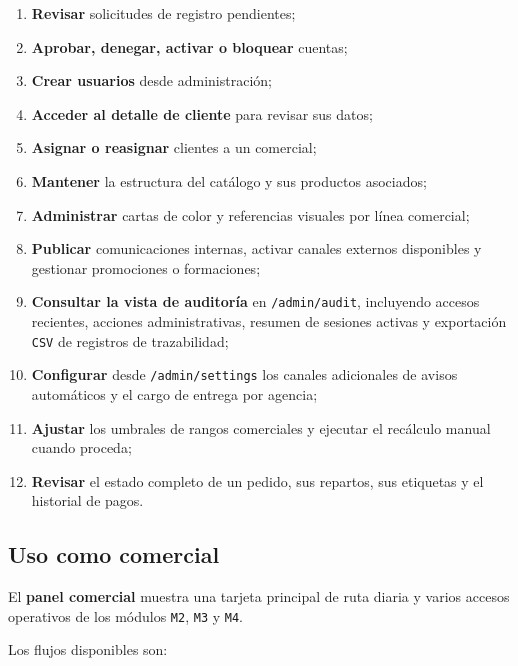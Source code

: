 \begin{enumerate}
    \item \textbf{Revisar} solicitudes de registro pendientes;
    \item \textbf{Aprobar, denegar, activar o bloquear} cuentas;
    \item \textbf{Crear usuarios} desde administración;
    \item \textbf{Acceder al detalle de cliente} para revisar sus datos;
    \item \textbf{Asignar o reasignar} clientes a un comercial;
    \item \textbf{Mantener} la estructura del catálogo y sus productos asociados;
    \item \textbf{Administrar} cartas de color y referencias visuales por línea comercial;
    \item \textbf{Publicar} comunicaciones internas, activar canales externos disponibles y gestionar promociones o formaciones;
    \item \textbf{Consultar la vista de auditoría} en \texttt{/admin/audit}, incluyendo accesos recientes, acciones administrativas, resumen de sesiones activas y exportación \texttt{CSV} de registros de trazabilidad;
    \item \textbf{Configurar} desde \texttt{/admin/settings} los canales adicionales de avisos automáticos y el cargo de entrega por agencia;
    \item \textbf{Ajustar} los umbrales de rangos comerciales y ejecutar el recálculo manual cuando proceda;
    \item \textbf{Revisar} el estado completo de un pedido, sus repartos, sus etiquetas y el historial de pagos.
\end{enumerate}

\subsection{Uso como comercial}

El \textbf{panel comercial} muestra una tarjeta principal de ruta diaria y varios accesos operativos de los módulos \texttt{M2}, \texttt{M3} y \texttt{M4}.

Los flujos disponibles son:

